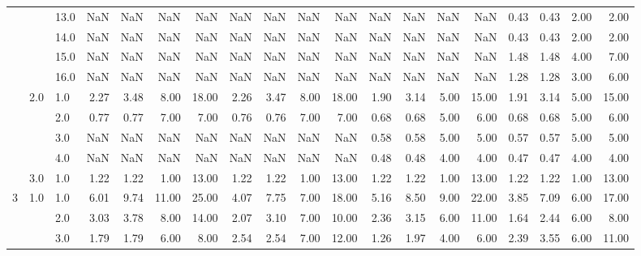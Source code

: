 \begin{tabular}{lllrrrrrrrrrrrrrrrr}
     &     & 13.0 &        NaN &       NaN &   NaN &    NaN &        NaN &       NaN &  NaN &    NaN &        NaN &       NaN &  NaN &    NaN &       0.43 &      0.43 & 2.00 &   2.00 \\
     &     & 14.0 &        NaN &       NaN &   NaN &    NaN &        NaN &       NaN &  NaN &    NaN &        NaN &       NaN &  NaN &    NaN &       0.43 &      0.43 & 2.00 &   2.00 \\
     &     & 15.0 &        NaN &       NaN &   NaN &    NaN &        NaN &       NaN &  NaN &    NaN &        NaN &       NaN &  NaN &    NaN &       1.48 &      1.48 & 4.00 &   7.00 \\
     &     & 16.0 &        NaN &       NaN &   NaN &    NaN &        NaN &       NaN &  NaN &    NaN &        NaN &       NaN &  NaN &    NaN &       1.28 &      1.28 & 3.00 &   6.00 \\
     & 2.0 & 1.0  &       2.27 &      3.48 &  8.00 &  18.00 &       2.26 &      3.47 & 8.00 &  18.00 &       1.90 &      3.14 & 5.00 &  15.00 &       1.91 &      3.14 & 5.00 &  15.00 \\
     &     & 2.0  &       0.77 &      0.77 &  7.00 &   7.00 &       0.76 &      0.76 & 7.00 &   7.00 &       0.68 &      0.68 & 5.00 &   6.00 &       0.68 &      0.68 & 5.00 &   6.00 \\
     &     & 3.0  &        NaN &       NaN &   NaN &    NaN &        NaN &       NaN &  NaN &    NaN &       0.58 &      0.58 & 5.00 &   5.00 &       0.57 &      0.57 & 5.00 &   5.00 \\
     &     & 4.0  &        NaN &       NaN &   NaN &    NaN &        NaN &       NaN &  NaN &    NaN &       0.48 &      0.48 & 4.00 &   4.00 &       0.47 &      0.47 & 4.00 &   4.00 \\
     & 3.0 & 1.0  &       1.22 &      1.22 &  1.00 &  13.00 &       1.22 &      1.22 & 1.00 &  13.00 &       1.22 &      1.22 & 1.00 &  13.00 &       1.22 &      1.22 & 1.00 &  13.00 \\
3 & 1.0 & 1.0  &       6.01 &      9.74 & 11.00 &  25.00 &       4.07 &      7.75 & 7.00 &  18.00 &       5.16 &      8.50 & 9.00 &  22.00 &       3.85 &      7.09 & 6.00 &  17.00 \\
     &     & 2.0  &       3.03 &      3.78 &  8.00 &  14.00 &       2.07 &      3.10 & 7.00 &  10.00 &       2.36 &      3.15 & 6.00 &  11.00 &       1.64 &      2.44 & 6.00 &   8.00 \\
     &     & 3.0  &       1.79 &      1.79 &  6.00 &   8.00 &       2.54 &      2.54 & 7.00 &  12.00 &       1.26 &      1.97 & 4.00 &   6.00 &       2.39 &      3.55 & 6.00 &  11.00 \\

\end{tabular}
